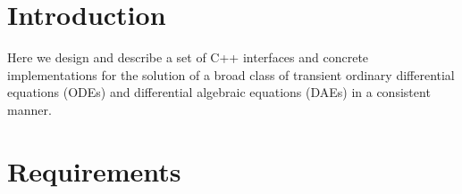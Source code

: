 \documentclass[pdf,ps2pdf,11pt]{SANDreport}
\begin{document}

%
\setcounter{secnumdepth}{3}
\SANDmain %

\section{Introduction}

Here we design and describe a set of C++ interfaces and concrete
implementations for the solution of a broad class of transient ordinary
differential equations (ODEs) and differential algebraic equations (DAEs) in a
consistent manner.

\section{Requirements}
\end{document}
